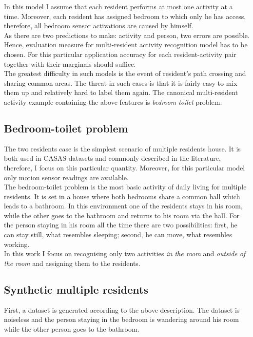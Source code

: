\documentclass[10pt, a4paper, pdflatex, leqno, twoside, openright]{report}
\begin{document}
In this model I assume that each resident performs at most one activity at a time. Moreover, each resident has assigned bedroom to which only he has access, therefore, all bedroom sensor activations are caused by himself.\\
As there are two predictions to make: activity and person, two errors are possible. Hence, evaluation measure for multi-resident activity recognition model has to be chosen. For this particular application accuracy for each resident-activity pair together with their marginals should suffice.\\

The greatest difficulty in such models is the event of resident's path crossing and sharing common areas. The threat in such cases is that it is fairly easy to mix them up and relatively hard to label them again. The canonical multi-resident activity example containing the above features is \emph{bedroom-toilet} problem.

    \subsection{Bedroom-toilet problem}
The two residents case is the simplest scenario of multiple residents house. It is both used in CASAS datasets and commonly described in the literature, therefore, I focus on this particular quantity. Moreover, for this particular model only motion sensor readings are available.\\

The bedroom-toilet problem is the most basic activity of daily living for multiple residents. It is set in a house where both bedrooms share a common hall which leads to a bathroom. In this environment one of the residents stays in his room, while the other goes to the bathroom and returns to his room via the hall. For the person staying in his room all the time there are two possibilities: first, he can stay still, what resembles sleeping; second, he can move, what resembles working.\\

In this work I focus on recognising only two activities \emph{in the room} and \emph{outside of the room} and assigning them to the residents.

    \subsection{Synthetic multiple residents}
First, a dataset is generated according to the above description. The dataset is noiseless and the person staying in the bedroom is wandering around his room while the other person goes to the bathroom.
\end{document}
